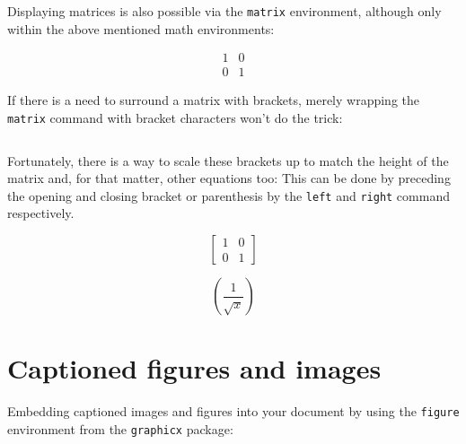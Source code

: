 \documentclass{article}
\begin{document}
Displaying matrices is also possible via the \texttt{matrix} environment,
although only within the above mentioned math environments:

\begin{equation*}
    \begin{matrix}
        1 & 0 \\
        0 & 1
    \end{matrix}
\end{equation*}

If there is a need to surround a matrix with brackets, merely wrapping the
\texttt{matrix} command with bracket characters won't do the trick:

\begin{equation*}
    [
        \begin{matrix}
            1 & 0 \\
            0 & 1
        \end{matrix}
    ]
\end{equation*}

Fortunately, there is a way to scale these brackets up to match the height of
the matrix and, for that matter, other equations too:
This can be done by preceding the opening and closing bracket or parenthesis by
the \texttt{left} and \texttt{right} command respectively.

\begin{equation*}
    \left[
        \begin{matrix}
            1 & 0 \\
            0 & 1
        \end{matrix}
    \right]
\end{equation*}

\begin{equation*}
    \left(\frac{1}{\sqrt{x}}\right)
\end{equation*}

\newpage
\section{Captioned figures and images}

Embedding captioned images and figures into your document by using the
\texttt{figure} environment from the \texttt{graphicx} package:

%
\end{document}
